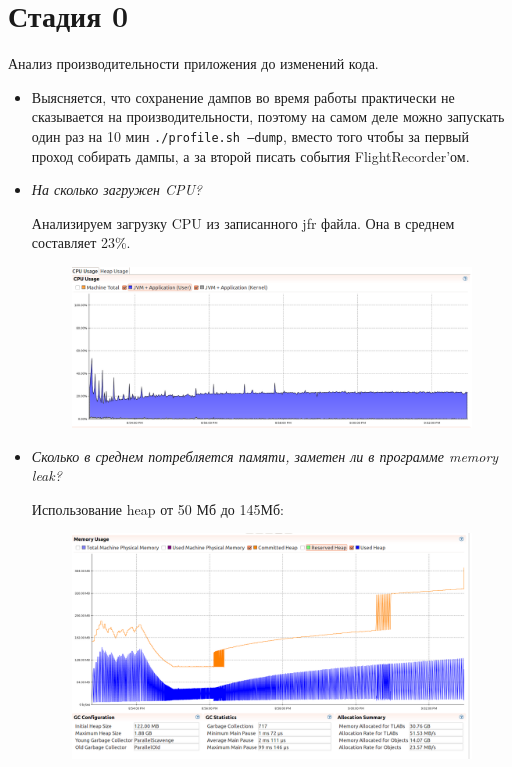 \documentclass{article}
\begin{document}
	\section*{Стадия 0}
	Анализ производительности приложения до изменений кода.
	\begin{itemize}
		\item Выясняется, что сохранение дампов во время работы практически не сказывается на производительности, поэтому на самом деле можно запускать один раз на 10 мин \texttt{./profile.sh --dump}, вместо того чтобы за первый проход собирать дампы, а за второй писать события FlightRecorder'ом.
		\newpage
		\item \textit{На сколько загружен CPU?}
		
		Анализируем загрузку CPU из записанного jfr файла. Она в среднем составляет 23\%. 
		\begin{figure}[h!] %
			\centering
			\includegraphics[width=0.95\linewidth]{img/stage_0/cpu.png}
			\label{fig:cpu0}
		\end{figure}
		
		\item \textit{Сколько в среднем потребляется памяти, заметен ли в программе memory leak?		}

		Использование heap от 50 Мб до 145Мб:
		\begin{figure}[h!] %
			\centering
			\includegraphics[width=0.95\linewidth]{img/stage_0/memory.png}
			\label{fig:mem0}
		\end{figure}
		\newpage


\end{itemize}
\end{document}
